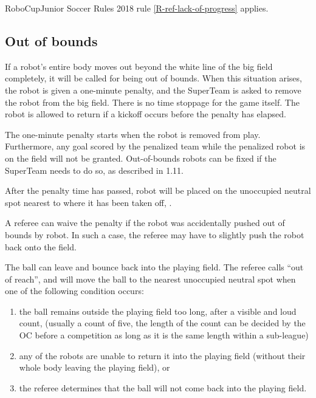 \documentclass{article}
\begin{document}
RoboCupJunior Soccer Rules 2018 rule \ref{R-ref-lack-of-progress} applies.

\subsection{Out of bounds \label{ref-011}}

If a robot's entire body moves out beyond the white line of the big field
completely, it will be called for being out of bounds. When this situation
arises, the robot is given a one-minute penalty, and the SuperTeam is asked to
remove the robot from the big field. There is no time stoppage for the game
itself. The robot is allowed to return if a kickoff occurs before the penalty
has elapsed.

The one-minute penalty starts when the robot is removed from play. Furthermore,
any goal scored by the penalized team while the penalized robot is on the field
will not be granted. Out-of-bounds robots can be fixed if the SuperTeam needs
to do so, as described in 1.11.

After the penalty time has passed, robot will be placed on the unoccupied
neutral spot nearest to where it has been taken off, .

A referee can waive the penalty if the robot was accidentally pushed out of
bounds by  robot. In such a case, the
referee may have to slightly push the robot back onto the field.

The ball can leave and bounce back into the playing field. The referee calls
``out of reach'', and will move the ball to the nearest unoccupied neutral spot
when one of the following condition occurs:

\begin{enumerate}
    \item the ball remains outside the playing field too long,
        after a visible and loud count, (usually a count of five, the length of
        the count can be decided by the OC before a competition as long as it
        is the same length within a sub-league)

    \item any of the robots are unable to return it into the playing field
        (without their whole body leaving the playing field), or

    \item the referee determines that the ball will not come back into the
        playing field.

\end{enumerate}
\end{document}
